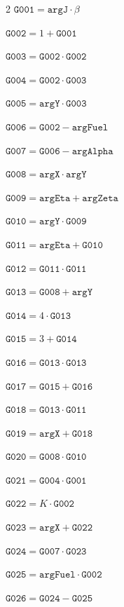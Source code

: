 \documentclass[10pt]{article}
\begin{document}
\begin{multicols}{2}\fontsize{8}{9}\selectfont
\noindent $\mathtt{G001}=\mathtt{argJ}\cdot \beta$\par
\noindent $\mathtt{G002}=1+\mathtt{G001}$\par
\noindent $\mathtt{G003}=\mathtt{G002}\cdot \mathtt{G002}$\par
\noindent $\mathtt{G004}=\mathtt{G002}\cdot \mathtt{G003}$\par
\noindent $\mathtt{G005}=\mathtt{argY}\cdot \mathtt{G003}$\par
\noindent $\mathtt{G006}=\mathtt{G002}-\mathtt{argFuel}$\par
\noindent $\mathtt{G007}=\mathtt{G006}-\mathtt{argAlpha}$\par
\noindent $\mathtt{G008}=\mathtt{argX}\cdot \mathtt{argY}$\par
\noindent $\mathtt{G009}=\mathtt{argEta}+\mathtt{argZeta}$\par
\noindent $\mathtt{G010}=\mathtt{argY}\cdot \mathtt{G009}$\par
\noindent $\mathtt{G011}=\mathtt{argEta}+\mathtt{G010}$\par
\noindent $\mathtt{G012}=\mathtt{G011}\cdot \mathtt{G011}$\par
\noindent $\mathtt{G013}=\mathtt{G008}+\mathtt{argY}$\par
\noindent $\mathtt{G014}=4\cdot \mathtt{G013}$\par
\noindent $\mathtt{G015}=3+\mathtt{G014}$\par
\noindent $\mathtt{G016}=\mathtt{G013}\cdot \mathtt{G013}$\par
\noindent $\mathtt{G017}=\mathtt{G015}+\mathtt{G016}$\par
\noindent $\mathtt{G018}=\mathtt{G013}\cdot \mathtt{G011}$\par
\noindent $\mathtt{G019}=\mathtt{argX}+\mathtt{G018}$\par
\noindent $\mathtt{G020}=\mathtt{G008}\cdot \mathtt{G010}$\par
\noindent $\mathtt{G021}=\mathtt{G004}\cdot \mathtt{G001}$\par
\noindent $\mathtt{G022}=K\cdot \mathtt{G002}$\par
\noindent $\mathtt{G023}=\mathtt{argX}+\mathtt{G022}$\par
\noindent $\mathtt{G024}=\mathtt{G007}\cdot \mathtt{G023}$\par
\noindent $\mathtt{G025}=\mathtt{argFuel}\cdot \mathtt{G002}$\par
\noindent $\mathtt{G026}=\mathtt{G024}-\mathtt{G025}$\par

\end{multicols}
\end{document}
